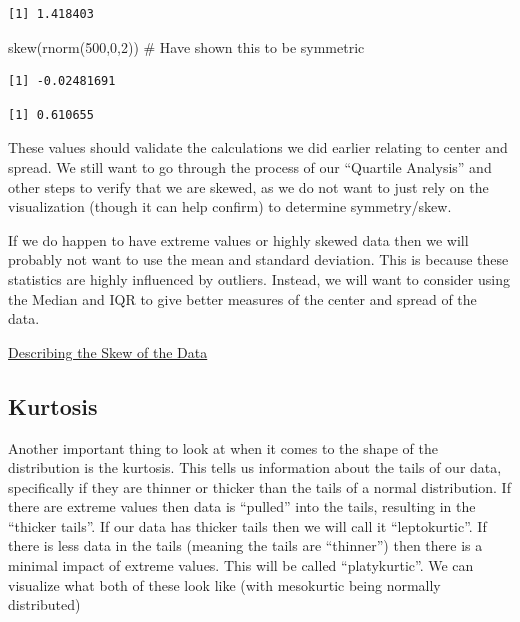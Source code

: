 \documentclass[
  letterpaper,
  DIV=11,
  numbers=noendperiod]{scrreprt}
\newenvironment{Shaded}{\begin{snugshade}}{\end{snugshade}}
\newcommand{\CommentTok}[1]{\textcolor[rgb]{0.37,0.37,0.37}{#1}}
\newcommand{\DecValTok}[1]{\textcolor[rgb]{0.68,0.00,0.00}{#1}}
\newcommand{\FunctionTok}[1]{\textcolor[rgb]{0.28,0.35,0.67}{#1}}
\newcommand{\NormalTok}[1]{\textcolor[rgb]{0.00,0.23,0.31}{#1}}
\newcommand{\SpecialCharTok}[1]{\textcolor[rgb]{0.37,0.37,0.37}{#1}}
\begin{document}
\begin{verbatim}
[1] 1.418403
\end{verbatim}

\begin{Shaded}
\begin{Highlighting}[]
\FunctionTok{skew}\NormalTok{(}\FunctionTok{rnorm}\NormalTok{(}\DecValTok{500}\NormalTok{,}\DecValTok{0}\NormalTok{,}\DecValTok{2}\NormalTok{)) }\CommentTok{\# Have shown this to be symmetric}
\end{Highlighting}
\end{Shaded}

\begin{verbatim}
[1] -0.02481691
\end{verbatim}

\begin{Shaded}
\end{Shaded}

\begin{verbatim}
[1] 0.610655
\end{verbatim}

These values should validate the calculations we did earlier relating to
center and spread. We still want to go through the process of our
``Quartile Analysis'' and other steps to verify that we are skewed, as
we do not want to just rely on the visualization (though it can help
confirm) to determine symmetry/skew.

If we do happen to have extreme values or highly skewed data then we
will probably not want to use the mean and standard deviation. This is
because these statistics are highly influenced by outliers. Instead, we
will want to consider using the Median and IQR to give better measures
of the center and spread of the data.

\begin{watch}{}{}
    \href{https://youtu.be/_VHtL0hgaKA}{Describing the Skew of the Data}
\end{watch}

\subsection{Kurtosis}\label{kurtosis}

Another important thing to look at when it comes to the shape of the
distribution is the kurtosis. This tells us information about the tails
of our data, specifically if they are thinner or thicker than the tails
of a normal distribution. If there are extreme values then data is
``pulled'' into the tails, resulting in the ``thicker tails''. If our
data has thicker tails then we will call it ``leptokurtic''. If there is
less data in the tails (meaning the tails are ``thinner'') then there is
a minimal impact of extreme values. This will be called ``platykurtic''.
We can visualize what both of these look like (with mesokurtic being
normally distributed)
\end{document}
